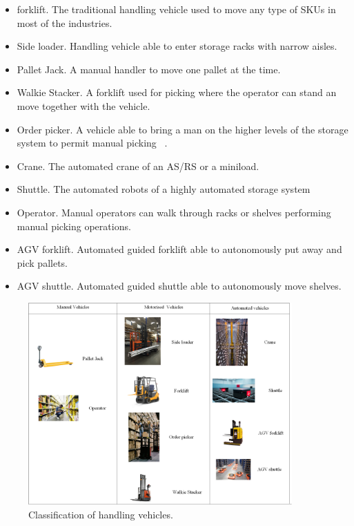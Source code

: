 \begin{itemize}
    \item forklift. The traditional handling vehicle used to move any type of SKUs in most of the industries.
    \item Side loader. Handling vehicle able to enter storage racks with narrow aisles.
    \item Pallet Jack. A manual handler to move one pallet at the time.
    \item Walkie Stacker. A forklift used for picking where the operator can stand an move together with the vehicle.
    \item Order picker. A vehicle able to bring a man on the higher levels of the storage system to permit manual picking ~\cite{Taylor2007}.
    \item Crane. The automated crane of an AS/RS or a miniload.
    \item Shuttle. The automated robots of a highly automated storage system
    \item Operator. Manual operators can walk through racks or shelves performing manual picking operations.
    \item AGV forklift. Automated guided forklift able to autonomously put away and pick pallets.
    \item AGV shuttle. Automated guided shuttle able to autonomously move shelves.

\end{itemize}


\begin{figure}[hbt!]
\centering
\includegraphics[width=0.9\textwidth]{SectionWarehouses/design_figures/fig_vehicles.png}
\captionsetup{type=figure}
\caption{Classification of handling vehicles.}
\label{fig_vehicles}
\end{figure}

